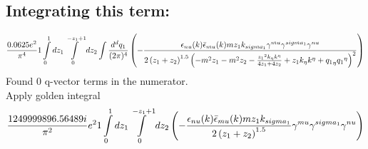 \subsection*{Integrating this term:}
\begin{dmath}\frac{0.0625 e^{2}}{\pi^{4}}1\int\limits_{ 0 }^{ 1 } d{ z_{ 1 } }\int\limits_{ 0 }^{ - { z_{ 1 } } + 1 } d{ z_{ 2 } }\int\frac{d^d q_1 }{ (2\pi)^4 }\left(- \frac{\epsilon_{ \\nu }({ k }) \bar{\epsilon}_{ \\mu }({ k }) m { z_{ 1 } } { { k }_{ \\sigma_1 } } { \gamma^{ \\mu } } { \gamma^{ \\sigma_1 } } { \gamma^{ \\nu } }}{2 \left({ z_{ 1 } } + { z_{ 2 } }\right)^{1.5} \left(- m^{2} { z_{ 1 } } - m^{2} { z_{ 2 } } - \frac{{ z_{ 1 } }^{2} { { k }_{ \eta } } { { k }^{ \eta } }}{4 { z_{ 1 } } + 4 { z_{ 2 } }} + { z_{ 1 } } { { k }_{ \eta } } { { k }^{ \eta } } + { { q_1 }_{ \eta } } { { q_1 }^{ \eta } }\right)^{2}}\right)\end{dmath}
Found 0 q-vector terms in the numerator.\\
Apply golden integral
\begin{dmath}\frac{1249999896.56489 i}{\pi^{2}} e^{2}1\int\limits_{ 0 }^{ 1 } d{ z_{ 1 } }\int\limits_{ 0 }^{ - { z_{ 1 } } + 1 } d{ z_{ 2 } }\left(- \frac{\epsilon_{ \\nu }({ k }) \bar{\epsilon}_{ \\mu }({ k }) m { z_{ 1 } } { { k }_{ \\sigma_1 } }}{2 \left({ z_{ 1 } } + { z_{ 2 } }\right)^{1.5}} { \gamma^{ \\mu } } { \gamma^{ \\sigma_1 } } { \gamma^{ \\nu } }\right)\end{dmath}
